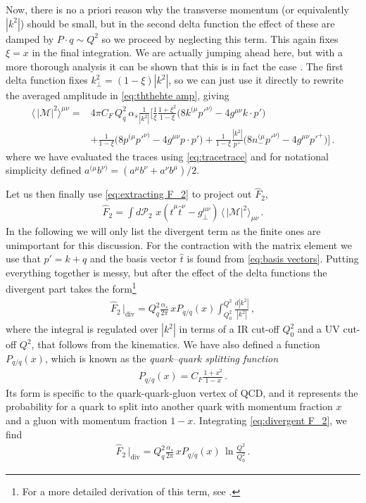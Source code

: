 Now, there is no a priori reason why the transverse momentum (or equivalently $|k^{2}|$) should be small, but in the second delta function the effect of these are damped by $P\cdot q\sim Q^{2}$ so we proceed by neglecting this term. This again fixes $\xi=x$ in the final integration. We are actually jumping ahead here, but with a more thorough analysis it can be shown that this is in fact the case \cite{Ellis1996QCDAC}. The first delta function fixes $k_{\perp}^{2}=(1-\xi)|k^{2}|$, so we can just use it directly to rewrite the averaged amplitude in \cref{eq:ththehte amp}, giving
\begin{align}
    \langle\, |\mathcal{M}|^{2}\rangle^{\mu\nu}=&4\pi C_{F}\,Q_{q}^{2}\,\alpha_{s}\frac{1}{|k^{2}|}\Big[\frac{1}{\xi}\frac{1+\xi^{2}}{1-\xi}\big(8k^{(\mu}p'^{\nu)}-4g^{\mu\nu}k\cdot p'\big)\nonumber
    \\
    &+\frac{1}{1-\xi}\big(8p^{(\mu}p'^{\nu)}-4g^{\mu\nu}p\cdot p'\big) + \frac{1}{1-\xi}\frac{|k^{2}|}{p^{+}}\big(8n_{-}^{(\mu}p'^{\nu)}-4g^{\mu\nu}p'^{+}\big)\Big]\,.
\end{align}
where we have evaluated the traces using \cref{eq:tracetrace} and for notational simplicity defined $a^{(\mu}b^{\nu)}=(a^{\mu}b^{\nu}+a^{\nu}b^{\mu})/2$.

Let us then finally use \cref{eq:extracting F_2} to project out $\hat{F}_{2}$,
\begin{align}
    \hat{F}_{2}=\int d\mathcal{P}_{2}\,\,x(\hat{t}^{\mu}\hat{t}^{\nu}-g_{\perp}^{\mu\nu})\,\langle\, |\mathcal{M}|^{2}\rangle_{\mu\nu}\,.
\end{align}
In the following we will only list the divergent term as the finite ones are unimportant for this discussion. For the contraction with the matrix element we use that $p'=k+q$ and the basis vector $\hat{t}$ is found from \cref{eq:basis vectors}. Putting everything together is messy, but after the effect of the delta functions the divergent part takes the form\footnote{For a more detailed derivation of this term, see \cite{Ellis1996QCDAC}.}
\begin{align}\label{eq:divergent F_2}
    \hat{F}_{2}\,\big|_{\text{div}}=Q_{q}^{2}\frac{\alpha_s}{2\pi}\,xP_{q/q}(x)\int_{Q_{0}^{2}}^{Q^{2}}\frac{d|k^{2}|}{|k^{2}|}\,,
\end{align}
where the integral is regulated over $|k^{2}|$ in terms of a IR cut-off $Q_{0}^{2}$ and a UV cut-off $Q^{2}$, that follows from the kinematics. We have also defined a function $P_{q/q}(x)$, which is known as the \emph{quark--quark splitting function}
\begin{align}\label{eq:splitting function 1}
    P_{q/q}(x)=C_{F}\frac{1+x^{2}}{1-x}\,.
\end{align}
Its form is specific to the quark-quark-gluon vertex of QCD, and it represents the probability for a quark to split into another quark with momentum fraction $x$ and a gluon with momentum fraction $1-x$. Integrating \cref{eq:divergent F_2}, we find
\begin{align}\label{eq:divergent integrated F_2}
    \hat{F}_{2}\,\big|_{\text{div}}=Q_{q}^{2}\frac{\alpha_s}{2\pi}\,xP_{q/q}(x)\,\ln{\frac{Q^{2}}{Q_{0}^{2}}}\,.
\end{align}

